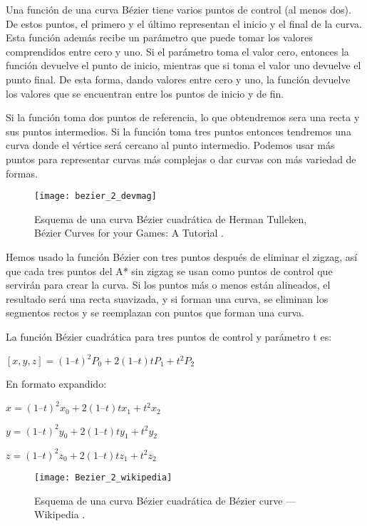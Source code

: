 Una función de una curva Bézier tiene varios puntos de control (al menos dos). De estos puntos, el primero y el último representan el inicio y el final de la curva. Esta función además recibe un parámetro que puede tomar los valores comprendidos entre cero y uno. Si el parámetro toma el valor cero, entonces la función devuelve el punto de inicio, mientras que si toma el valor uno devuelve el punto final. De esta forma, dando valores entre cero y uno, la función devuelve los valores que se encuentran entre los puntos de inicio y de fin.

Si la función toma dos puntos de referencia, lo que obtendremos sera una recta y sus puntos intermedios. Si la función toma tres puntos entonces tendremos una curva donde el vértice será cercano al punto intermedio. Podemos usar más puntos para representar curvas más complejas o dar curvas con más variedad de formas.

\begin{figure}[htpb]
    \centering
    \texttt{[image: bezier\_2\_devmag]}
    \caption[Esquema de una curva Bézier cuadrática de Herman Tulleken]{Esquema de una curva Bézier cuadrática de Herman Tulleken, Bézier Curves for your Games: A Tutorial \cite{bezierdevmag_imagen}.}
    \label{fig:basics AFM sketch}
\end{figure}

Hemos usado la función Bézier con tres puntos después de eliminar el zigzag, así que cada tres puntos del A* sin zigzag se usan como puntos de control que servirán para crear la curva. Si los puntos más o menos están alineados, el resultado será una recta suavizada, y si forman una curva, se eliminan los segmentos rectos y se reemplazan con puntos que forman una curva. 

La función Bézier cuadrática para tres puntos de control y parámetro t es:

\begin{center}
$[x, y, z] = (1 – t)^2P_0 + 2(1 – t)tP_1 + t^2P_2$
\end{center}

En formato expandido:
\begin{center}
$x = (1 – t)^2x_0 + 2(1 – t)tx_1 + t^2x_2$

$y = (1 – t)^2y_0 + 2(1 – t)ty_1 + t^2y_2$

$z = (1 – t)^2z_0 + 2(1 – t)tz_1 + t^2z_2$
\end{center}

\begin{figure}[htpb]
    \centering
    \texttt{[image: Bezier\_2\_wikipedia]}
    \caption[Esquema de una curva Bézier cuadrática, Wikipedia]{Esquema de una curva Bézier cuadrática de Bézier curve --- Wikipedia \cite{wiki:bezierimagen}.}
    \label{fig:basics AFM sketch}
\end{figure}

